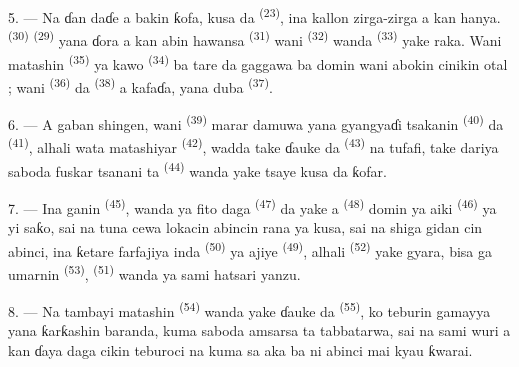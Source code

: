 5. --- Na ɗan daɗe a bakin ƙofa, kusa da 
\textsuperscript{(23)}, ina kallon zirga-zirga a kan hanya.
 \textsuperscript{(30)} 
\textsuperscript{(29)} yana ɗora a kan abin hawansa 
\textsuperscript{(31)} wani  \textsuperscript{(32)} wanda
 \textsuperscript{(33)} yake raka. Wani matashin  \textsuperscript{(35)} ya kawo  \textsuperscript{(34)} ba tare
da gaggawa ba domin wani abokin cinikin otal ; wani 
\textsuperscript{(36)} da  \textsuperscript{(38)} a kafaɗa,
yana duba  \textsuperscript{(37)}.

\VUsaut{4.0mm}
\VUsaut{3.0mm}

6. --- A gaban shingen, wani  \textsuperscript{(39)} marar
damuwa yana gyangyaɗi tsakanin 
\textsuperscript{(40)} da 
\textsuperscript{(41)}, alhali wata matashiyar 
\textsuperscript{(42)}, wadda take ɗauke da 
\textsuperscript{(43)} na tufafi, take dariya saboda fuskar tsanani ta
 \textsuperscript{(44)} wanda yake tsaye kusa da
ƙofar.

7. --- Ina ganin  \textsuperscript{(45)}, wanda ya fito
daga  \textsuperscript{(47)} da yake a  \textsuperscript{(48)} domin ya aiki  \textsuperscript{(46)} ya yi saƙo, sai na tuna cewa lokacin abincin
rana ya kusa, sai na shiga gidan cin abinci, ina ƙetare farfajiya inda
 \textsuperscript{(50)} ya ajiye 
\textsuperscript{(49)}, alhali  \textsuperscript{(52)} yake
gyara, bisa ga umarnin  \textsuperscript{(53)},
 \textsuperscript{(51)} wanda ya sami hatsari
yanzu.

8. --- Na tambayi matashin  \textsuperscript{(54)} wanda
yake ɗauke da  \textsuperscript{(55)}, ko teburin
gamayya yana ƙarƙashin baranda, kuma saboda amsarsa ta tabbatarwa, sai
na sami wuri a kan ɗaya daga cikin teburoci na kuma sa aka ba ni abinci
mai kyau ƙwarai.


